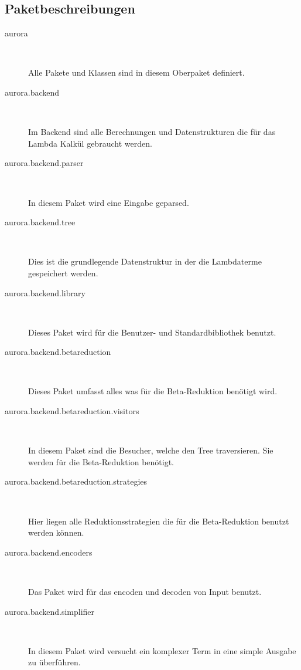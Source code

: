 \documentclass[parskip=full,11pt,twoside]{scrbook}
\begin{document}
\subsection{Paketbeschreibungen}
\begin{description}
	
	
	\item[aurora] ~\par
	Alle Pakete und Klassen sind in diesem Oberpaket definiert.
	
	\item[aurora.backend] ~\par
	Im Backend sind alle Berechnungen und Datenstrukturen die für das Lambda Kalkül gebraucht werden. 
	
	\item[aurora.backend.parser] ~\par
	In diesem Paket wird eine Eingabe geparsed.

	\item[aurora.backend.tree] ~\par
	Dies ist die grundlegende Datenstruktur in der die Lambdaterme gespeichert werden.
	
	\item[aurora.backend.library] ~\par
	Dieses Paket wird für die Benutzer- und Standardbibliothek benutzt.
	
	\item[aurora.backend.betareduction] ~\par
	Dieses Paket umfasst alles was für die Beta-Reduktion benötigt wird.
	
	\item[aurora.backend.betareduction.visitors] ~\par
	 In diesem Paket sind die Besucher, welche den Tree traversieren. Sie werden für die Beta-Reduktion benötigt.  
	\item[aurora.backend.betareduction.strategies] ~\par
	Hier liegen alle Reduktionsstrategien die für die Beta-Reduktion benutzt werden können.

	\item[aurora.backend.encoders] ~\par
	Das Paket wird für das encoden und decoden von Input benutzt.
	
	\item[aurora.backend.simplifier] ~\par
	In diesem Paket wird versucht ein komplexer Term in eine simple Ausgabe zu überführen.
	

\end{description}
\end{document}
